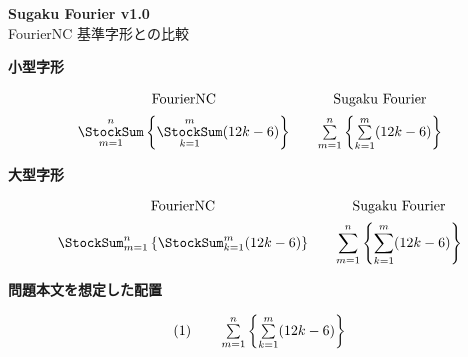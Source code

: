 \documentclass[lualatex,paper=a5,fontsize=10pt]{jlreq}
\newcommand{\CompactStockSum}[2]{%
  \mathop{\textstyle\StockSum}\limits_{#1}^{#2}%
}
\newcommand{\CompactSugakuSum}[2]{%
  \mathop{\textstyle\sum}\limits_{#1}^{#2}%
}
\begin{document}
\begin{center}
  {\sffamily\bfseries Sugaku Fourier v1.0}\\
  {\small FourierNC 基準字形との比較}
\end{center}

\noindent\textbf{小型字形}

\[
  \begin{array}{c@{\qquad}c}
    \text{\rmfamily FourierNC} &
    \text{\rmfamily Sugaku Fourier} \\[1.2ex]
    \CompactStockSum{m=1}{n}
      \left\{\CompactStockSum{k=1}{m}(12k-6)\right\}
    &
    \CompactSugakuSum{m=1}{n}
      \left\{\CompactSugakuSum{k=1}{m}(12k-6)\right\}
  \end{array}
\]

\noindent\textbf{大型字形}

\[
  \begin{array}{c@{\qquad}c}
    \text{\rmfamily FourierNC} &
    \text{\rmfamily Sugaku Fourier} \\[1.2ex]
    \displaystyle
    \StockSum_{m=1}^{n}
      \left\{\StockSum_{k=1}^{m}(12k-6)\right\}
    &
    \displaystyle
    \sum_{m=1}^{n}
      \left\{\sum_{k=1}^{m}(12k-6)\right\}
  \end{array}
\]

\noindent\textbf{問題本文を想定した配置}

\[
  \text{\rmfamily (1)}\qquad
  \CompactSugakuSum{m=1}{n}
  \left\{
    \CompactSugakuSum{k=1}{m}(12k-6)
  \right\}
\]
\end{document}
